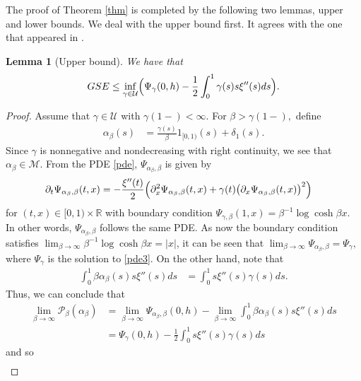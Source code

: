 \documentclass[12pt]{article}
\newtheorem{lemma}{\bf Lemma}
\newenvironment{Proof of lemma}{\noindent{\bf Proof of Lemma}}{\hfill$\Box$\newline}
\newenvironment{Proof of theorem}{\noindent{\bf Proof of Theorem}}{\hfill{\footnotesize${\square}$}\newline}
\newenvironment{Proof of theorems}{\noindent{\bf Proof of Theorems}}{\hfill$\Box$\newline}
\newenvironment{Proof of proposition}{\noindent{\bf Proof of Proposition}}{\hfill$\Box$\newline}
\newenvironment{Proof of propositions}{\noindent{\bf Proof of Propositions}}{\hfill$\Box$\newline}
\newenvironment{Proof of exercise}{\noindent{\it Proof of Exercise:}}{\hfill$\Box$}
\begin{document}
The proof of Theorem \ref{thm} is completed by the following two lemmas, upper and lower bounds. We deal with the upper bound first. It agrees with the one that appeared in  \cite[Theorem 6]{G}.

\begin{lemma}[Upper bound] \label{up}
 We have that
	\begin{align*}
	GSE\leq \inf_{\gamma\in\mathcal{U}}\Bigl(\Psi_\gamma(0,h)-\frac{1}{2}\int_0^1\gamma(s)s\xi''(s)ds\Bigr).
	\end{align*}
\end{lemma}



\begin{proof}
	Assume that $\gamma\in \mathcal{U}$ with $\gamma(1-)<\infty.$ For $\beta>\gamma(1-),$ define 
	\begin{align*}
	\alpha_\beta(s)&=\frac{\gamma(s)}{\beta}1_{[0,1)}(s)+\delta_1(s).
	\end{align*}
	Since $\gamma$ is nonnegative and nondecreasing with right continuity, we see that $\alpha_\beta\in\mathcal{M}.$ From the PDE \eqref{pde}, $\Psi_{\alpha_\beta,\beta}$ is given by
	\begin{align*}
	\partial_t{\Psi}_{\alpha_{\beta},\beta}(t,x)&=-\frac{\xi''(t)}{2}\Bigl(\partial_x^2{\Psi}_{\alpha_\beta,\beta}(t,x)+\gamma(t)\bigl(\partial_x{\Psi}_{\alpha_\beta,\beta}(t,x)\bigr)^2\Bigr)
	\end{align*}
	for $(t,x)\in[0,1)\times\mathbb{R}$ with boundary condition ${\Psi}_{\gamma,\beta}(1,x)=\beta^{-1}\log\cosh \beta x.$ In other words, $\Psi_{\alpha_\beta,\beta}$ follows the same PDE. As now the boundary condition satisfies $\lim_{\beta\rightarrow\infty}\beta^{-1}\log\cosh \beta x=|x|$, it can be seen that $\lim_{\beta\rightarrow\infty}\Psi_{\alpha_\beta,\beta}=\Psi_\gamma,$ where $\Psi_\gamma$ is the solution to \eqref{pde3}. On the other hand, note that
	\begin{align*}
	\int_0^1\beta\alpha_{\beta}(s)s\xi''(s)ds&=\int_0^{1}s\xi''(s)\gamma(s)ds.
	\end{align*}
	Thus, we can conclude that
	\begin{align*}
	\lim_{\beta\rightarrow\infty} \mathcal{P}_{\beta}(\alpha_\beta)&=\lim_{\beta\rightarrow\infty}\Psi_{\alpha_\beta,\beta}(0,h)-\lim_{\beta\rightarrow\infty}\int_0^1\beta\alpha_{\beta}(s)s\xi''(s)ds\\
	&=\Psi_\gamma(0,h)-\frac{1}{2}\int_0^1s\xi''(s)\gamma(s)ds
	\end{align*}
	and so
	\begin{align}

\end{align}
\end{proof}
\end{document}
